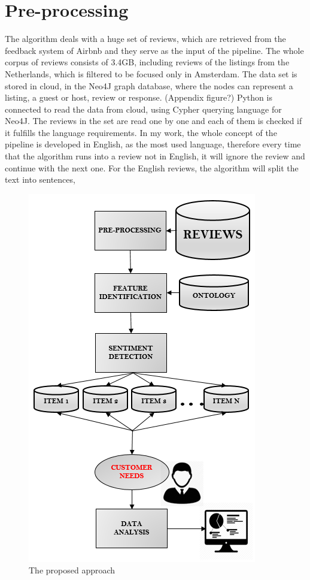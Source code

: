 \section{Pre-processing}
The algorithm deals with a huge set of reviews, which are retrieved from the feedback system of Airbnb and they serve as the input of the pipeline. The whole corpus of reviews consists of 3.4GB, including reviews of the listings from the Netherlands, which is filtered to be focused only in Amsterdam. The data set is stored in cloud, in the Neo4J graph database, where the nodes can represent a listing, a guest or host, review or response. (Appendix figure?)
Python is connected to read the data from cloud, using Cypher querying language for Neo4J. The reviews in the set are read one by one and each of them is checked if it fulfills the language requirements. In my work, the whole concept of the pipeline is developed in English, as the most used language, therefore every time that the algorithm runs into a review not in English, it will ignore the review and continue with the next one. For the English reviews, the algorithm will split the text into sentences, 
\begin{figure}[h!]
	\centering
	\includegraphics[height=0.72\textheight]{Pipeline1}
	\caption{The proposed approach}
	\label{fig:pipe}
\end{figure} 
